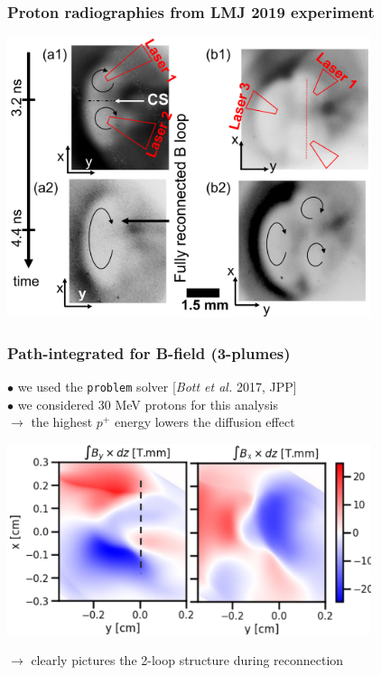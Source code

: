 \documentclass{beamer}
\begin{document}
\begin{frame}
\frametitle{Proton radiographies from LMJ 2019 experiment}

\begin{center}
\includegraphics[width=0.8\textwidth]{rcf_lmj.png}
\end{center}

\end{frame}



\begin{frame}
\frametitle{Path-integrated for B-field (3-plumes)}

$\bullet$ we used the \texttt{problem} solver [\textit{Bott et al.} 2017, JPP]\\
$\bullet$ we considered 30 MeV protons for this analysis \\
$\to$ the highest $p^+$ energy lowers the diffusion effect

\begin{center}
\includegraphics[width=0.8\textwidth]{B_integrated.png}
\end{center}

$\to$ clearly pictures the 2-loop structure during reconnection

\end{frame}
\end{document}

